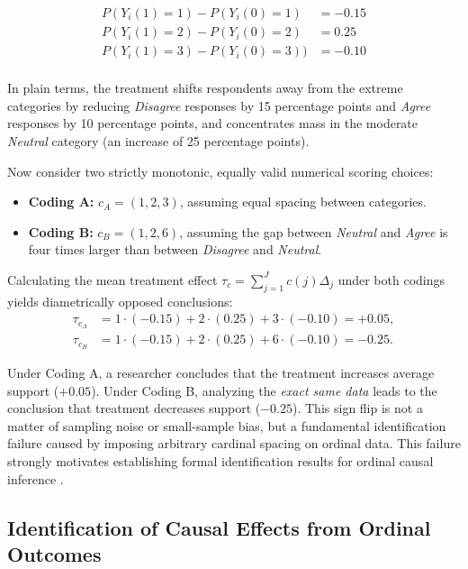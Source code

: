 \documentclass{article}
\begin{document}
\[
  \begin{aligned}
     P(Y_i(1)=1) - P(Y_i(0)=1) &= -0.15 \\
     P(Y_i(1)=2) - P(Y_i(0)=2) &= 0.25 \\
     P(Y_i(1)=3) - P(Y_i(0)=3)) &= -0.10 \\
  \end{aligned}
\]

In plain terms, the treatment shifts respondents away from the extreme categories by reducing \textit{Disagree} responses by 15 percentage points and \textit{Agree} responses by 10 percentage points, and concentrates mass in the moderate \textit{Neutral} category (an increase of 25 percentage points).

Now consider two strictly monotonic, equally valid numerical scoring choices:
\begin{itemize}
    \item \textbf{Coding A:} $c_A = (1, 2, 3)$, assuming equal spacing between categories.
    \item \textbf{Coding B:} $c_B = (1, 2, 6)$, assuming the gap between \textit{Neutral} and \textit{Agree} is four times larger than between \textit{Disagree} and \textit{Neutral}.
\end{itemize}

Calculating the mean treatment effect $\tau_c = \sum_{j=1}^J c(j)\Delta_j$ under both codings yields diametrically opposed conclusions:
\begin{align*}
  \tau_{c_A} &= 1 \cdot (-0.15) + 2 \cdot (0.25) + 3 \cdot (-0.10) = \mathbf{+0.05}, \\
  \tau_{c_B} &= 1 \cdot (-0.15) + 2 \cdot (0.25) + 6 \cdot (-0.10) = \mathbf{-0.25}.
\end{align*}

Under Coding A, a researcher concludes that the treatment increases average support ($+0.05$). Under Coding B, analyzing the \emph{exact same data} leads to the conclusion that treatment decreases support ($-0.25$). This sign flip is not a matter of sampling noise or small-sample bias, but a fundamental identification failure caused by imposing arbitrary cardinal spacing on ordinal data. This failure strongly motivates establishing formal identification results for ordinal causal inference \citep{Schroder2017a, Bond2018a}.

\subsection{Identification of Causal Effects from Ordinal Outcomes}
\label{subsec:identification}
\end{document}
